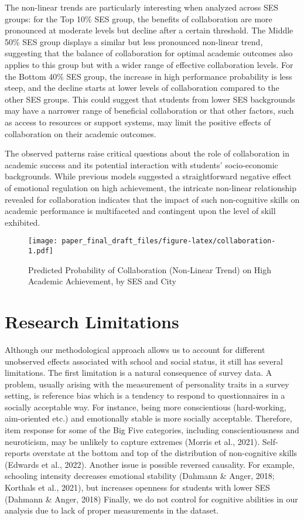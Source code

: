 \documentclass[
  12pt,
  a4paper,
]{article}
\begin{document}
The non-linear trends are particularly interesting when analyzed across
SES groups: for the Top 10\% SES group, the benefits of collaboration
are more pronounced at moderate levels but decline after a certain
threshold. The Middle 50\% SES group displays a similar but less
pronounced non-linear trend, suggesting that the balance of
collaboration for optimal academic outcomes also applies to this group
but with a wider range of effective collaboration levels. For the Bottom
40\% SES group, the increase in high performance probability is less
steep, and the decline starts at lower levels of collaboration compared
to the other SES groups. This could suggest that students from lower SES
backgrounds may have a narrower range of beneficial collaboration or
that other factors, such as access to resources or support systems, may
limit the positive effects of collaboration on their academic outcomes.

The observed patterns raise critical questions about the role of
collaboration in academic success and its potential interaction with
students' socio-economic backgrounds. While previous models suggested a
straightforward negative effect of emotional regulation on high
achievement, the intricate non-linear relationship revealed for
collaboration indicates that the impact of such non-cognitive skills on
academic performance is multifaceted and contingent upon the level of
skill exhibited.

\begin{figure}
\centering
\texttt{[image: paper\_final\_draft\_files/figure-latex/collaboration-1.pdf]}
\caption{Predicted Probability of Collaboration (Non-Linear Trend) on
High Academic Achievement, by SES and City}
\end{figure}

\hypertarget{research-limitations}{%
\section{Research Limitations}\label{research-limitations}}

Although our methodological approach allows us to account for different
unobserved effects associated with school and social status, it still
has several limitations. The first limitation is a natural consequence
of survey data. A problem, usually arising with the measurement of
personality traits in a survey setting, is reference bias which is a
tendency to respond to questionnaires in a socially acceptable way. For
instance, being more conscientious (hard-working, aim-oriented etc.) and
emotionally stable is more socially acceptable. Therefore, item response
for some of the Big Five categories, including conscientiousness and
neuroticism, may be unlikely to capture extremes (Morris et al., 2021).
Self-reports overstate at the bottom and top of the distribution of
non-cognitive skills (Edwards et al., 2022). Another issue is possible
reversed causality. For example, schooling intensity decreases emotional
stability (Dahmann \& Anger, 2018; Korthals et al., 2021), but increases
openness for students with lower SES (Dahmann \& Anger, 2018) Finally,
we do not control for cognitive abilities in our analysis due to lack of
proper measurements in the dataset.
\end{document}
